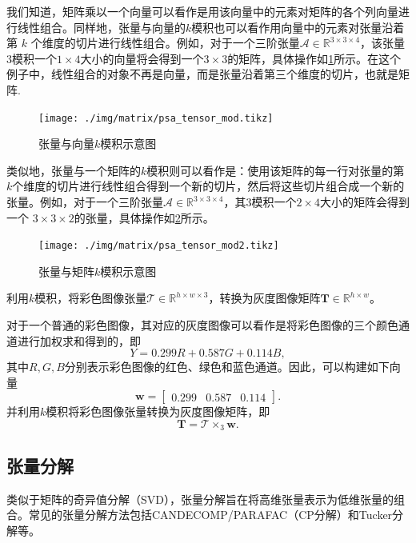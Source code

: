 我们知道，矩阵乘以一个向量可以看作是用该向量中的元素对矩阵的各个列向量进行线性组合。同样地，张量与向量的$k$模积也可以看作用向量中的元素对张量沿着第 $k$ 个维度的切片进行线性组合。例如，对于一个三阶张量$\mathcal A \in \mathbb {R}^{3 \times 3 \times 4 }$，该张量3模积一个$1\times 4$大小的向量将会得到一个\( 3 \times 3 \)的矩阵，具体操作如\cref{fig.psa.nmod_example}所示。在这个例子中，线性组合的对象不再是向量，而是张量沿着第三个维度的切片，也就是矩阵.
\begin{figure}[htb!]
    \centering
    \texttt{[image: ./img/matrix/psa\_tensor\_mod.tikz]}
    \caption{张量与向量$k$模积示意图}
    \label{fig.psa.nmod_example}
\end{figure}

类似地，张量与一个矩阵的$k$模积则可以看作是：使用该矩阵的每一行对张量的第$k$个维度的切片进行线性组合得到一个新的切片，然后将这些切片组合成一个新的张量。例如，对于一个三阶张量$\mathcal A \in \mathbb {R}^{3 \times 3 \times 4 }$，其3模积一个$2\times 4$大小的矩阵会得到一个 \( 3 \times 3 \times 2 \)的张量，具体操作如\cref{fig.psa.nmod_example2}所示。
\begin{figure}[htb!]
    \centering
    \texttt{[image: ./img/matrix/psa\_tensor\_mod2.tikz]}
    \caption{张量与矩阵$k$模积示意图}
    \label{fig.psa.nmod_example2}
\end{figure}

\begin{example}
    利用\( k \)模积，将彩色图像张量\( \mathcal{T} \in \mathbb{R}^{h \times w \times 3} \)，转换为灰度图像矩阵\( \mathbf{T} \in \mathbb{R}^{h \times w} \)。
\end{example}
\begin{solution}
    对于一个普通的彩色图像，其对应的灰度图像可以看作是将彩色图像的三个颜色通道进行加权求和得到的，即
    \[
        Y = 0.299 R + 0.587 G + 0.114 B,
    \]
    其中\( R, G, B \)分别表示彩色图像的红色、绿色和蓝色通道。因此，可以构建如下向量
    \[
        \bm{w} = \begin{bmatrix} 0.299 & 0.587 & 0.114 \end{bmatrix}.
    \]
    并利用\( k \)模积将彩色图像张量转换为灰度图像矩阵，即
    \[
        \mathbf{T} = \mathcal{T} \times_3 \bm{w}.
    \]
\end{solution}

\subsection{张量分解}

类似于矩阵的奇异值分解（SVD），张量分解旨在将高维张量表示为低维张量的组合。常见的张量分解方法包括CANDECOMP/PARAFAC（CP分解）和Tucker分解等。

